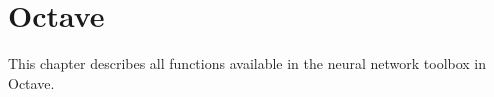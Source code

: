 \chapter{Octave}
This chapter describes all functions available in the neural network toolbox in Octave.



